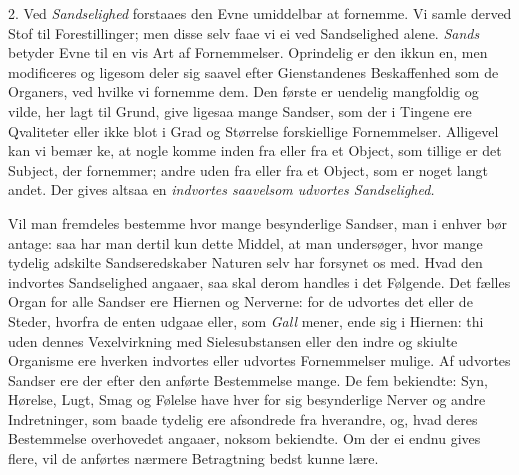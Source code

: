 \documentclass[12pt,a4paper]{article}
\newcommand{\opage}[1]{\marginnote{\footnotesize\textit{[#1]}}}
\begin{document}
2. Ved \emph{Sandselighed} forstaaes den Evne umiddelbar at fornemme. Vi samle derved
Stof til Forestillinger; men disse selv faae vi ei ved Sandselighed alene. \emph{Sands}
betyder Evne til en vis Art af Fornemmelser. Oprindelig er den ikkun en, men
modificeres og ligesom deler sig saavel efter Gienstandenes Beskaffenhed som de
Organers, ved hvilke vi fornemme dem. Den første er uendelig mangfoldig og vilde, her
lagt til Grund, give ligesaa mange Sandser, som der i Tingene ere Qvaliteter eller ikke
blot i Grad og Størrelse forskiellige Fornemmelser. Alligevel kan vi bemær%
\opage{61}ke, at nogle komme inden fra eller fra et Object, som tillige er det Subject, der
fornemmer; andre uden fra eller fra et Object, som er noget langt andet. Der gives
altsaa en \emph{indvortes saavelsom udvortes Sandselighed.}

Vil man fremdeles bestemme hvor mange besynderlige Sandser, man i enhver bør antage:
saa har man dertil kun dette Middel, at man undersøger, hvor mange tydelig adskilte
Sandseredskaber Naturen selv har forsynet os med. Hvad den indvortes Sandselighed
angaaer, saa skal derom handles i det Følgende. Det fælles Organ for alle Sandser ere
Hiernen og Nerverne: for de udvortes det eller de Steder, hvorfra de enten udgaae
eller, som \emph{Gall} mener, ende sig i Hiernen: thi uden dennes Vexelvirkning med
Sielesubstansen eller den indre og skiulte Organisme ere hverken indvortes eller
udvortes Fornemmelser mulige. Af udvortes Sandser ere der efter den anførte
Bestemmelse mange. De fem bekiendte: Syn, Hørelse, Lugt, Smag og Følelse have hver for
sig besynderlige Nerver og andre Indretninger, som baade tydelig ere afsondrede fra
hverandre, og, hvad deres Bestemmelse overhovedet angaaer, noksom bekiendte. Om der ei
endnu gives flere, vil de anførtes nærmere Betragtning bedst kunne lære.
\end{document}
